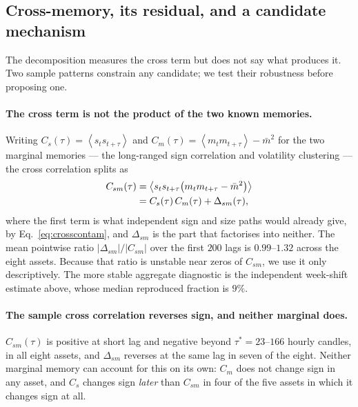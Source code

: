 \documentclass[aps,pre,twocolumn,superscriptaddress,floatfix,nofootinbib]{revtex4-2}
\newcommand{\avg}[1]{\left\langle #1 \right\rangle}
\begin{document}
\iffalse
\subsection{Cross-memory, its residual, and a candidate mechanism}
\label{sec:desarme}

The decomposition measures the cross term but does not say what produces it.
Two sample patterns constrain any candidate; we test their robustness before
proposing one.

\paragraph*{The cross term is not the product of the two known memories.}
Writing $C_s(\tau)=\avg{s_t s_{t+\tau}}$ and
$C_m(\tau)=\avg{m_t m_{t+\tau}}-\bar m^2$ for the two marginal memories --- the
long-ranged sign correlation and volatility clustering --- the cross
correlation splits as
\begin{align}
  C_{sm}(\tau)&=\avg{s_t s_{t+\tau}\bigl(m_t m_{t+\tau}-\bar m^{2}\bigr)} \notag \\
  &=C_s(\tau)\,C_m(\tau)+\Delta_{sm}(\tau) ,
  \label{eq:csmsplit}
\end{align}
where the first term is what independent sign and size paths would already
give, by Eq.~\eqref{eq:crosscontam}, and $\Delta_{sm}$ is the part that
factorises into neither. The mean pointwise ratio
$|\Delta_{sm}|/|C_{sm}|$ over the first $200$ lags is $0.99$--$1.32$ across the
eight assets. Because that ratio is unstable near zeros of $C_{sm}$, we use it
only descriptively. The more stable aggregate diagnostic is the independent
week-shift estimate above, whose median reproduced fraction is $9\%$.

\paragraph*{The sample cross correlation reverses sign, and neither marginal does.}
$C_{sm}(\tau)$ is positive at short lag and negative beyond
$\tau^{*}=23$--$166$ hourly candles, in all eight assets, and $\Delta_{sm}$
reverses at the same lag in seven of the eight. Neither marginal memory can account for
this on its own: $C_m$ does not change sign in any asset, and $C_s$ changes
sign \emph{later} than $C_{sm}$ in four of the five assets in which it changes
sign at all.
\end{document}
